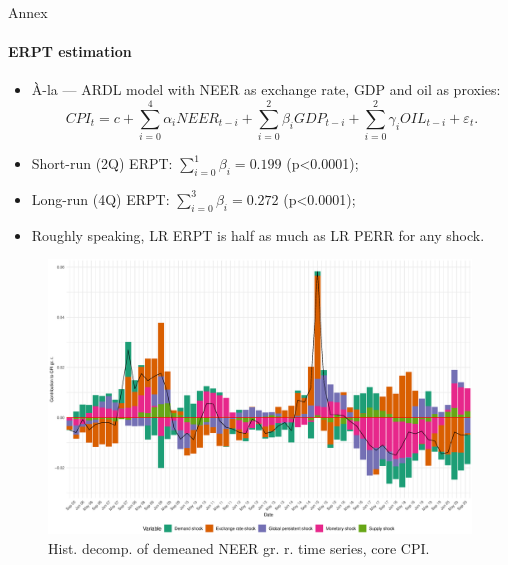 \documentclass{beamer}
\begin{document}
\begin{frame}[noframenumbering]{Annex}
	\hypertarget{uncerpt}{}
	\framesubtitle{ERPT estimation}
	\begin{itemize}
		\item À-la \parencite{Campa2005} --- ARDL model with NEER as exchange rate, GDP and oil as proxies:
	\begin{equation}
		CPI_t = c + \sum_{i=0}^4 \alpha_i NEER_{t-i} + \sum_{i=0}^2 \beta_i GDP_{t-i}  + \sum_{i=0}^2 \gamma_i OIL_{t-i} + \varepsilon_t.
	\end{equation}
		\item Short-run (2Q) ERPT: $\sum_{i=0}^1 \beta_i = 0.199$ (p<0.0001);
		\item Long-run (4Q) ERPT: $\sum_{i=0}^3 \beta_i = 0.272$ (p<0.0001);
		\item Roughly speaking, LR ERPT is half as much as LR PERR for any shock.
	\end{itemize}
\end{frame}

\begin{frame}[noframenumbering]
	\label{corehd}
	\begin{figure}[h!]
		\centering
		\includegraphics[width=1\linewidth]{../Text/figures/hd_core_cpi_full}
		\caption[]{Hist. decomp. of demeaned NEER gr. r. time series, core CPI.}
		\label{fig:hd_cpi_core}
	\end{figure}
\end{frame}
\end{document}
